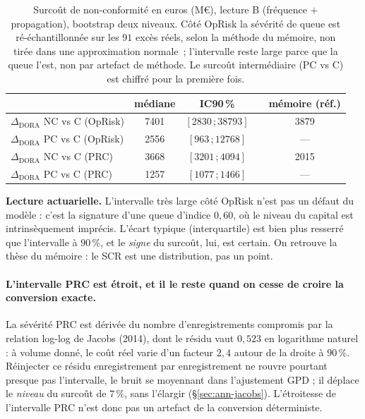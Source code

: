 \begin{table}[htbp]\centering\small
\renewcommand{\arraystretch}{1.25}
\begin{tabular}{@{}l cc c c@{}}
\toprule
& médiane & IC90\,\% & & mémoire (réf.) \\
\midrule
$\Delta_{\text{DORA}}$ NC vs C (OpRisk) & 7401 & $[2830\,;38793]$ & & 3879 \\
$\Delta_{\text{DORA}}$ PC vs C (OpRisk) & 2556 & $[963\,;12768]$  & & --- \\
$\Delta_{\text{DORA}}$ NC vs C (PRC)    & 3668 & $[3201\,;4094]$  & & 2015 \\
$\Delta_{\text{DORA}}$ PC vs C (PRC)    & 1257 & $[1077\,;1466]$  & & --- \\
\bottomrule
\end{tabular}
\caption{Surcoût de non-conformité en euros (M\euro), lecture B (fréquence $+$ propagation),
bootstrap deux niveaux. Côté OpRisk la sévérité de queue est ré-échantillonnée sur les
$91$ excès réels, selon la méthode du mémoire, non tirée dans une approximation
normale~; l'intervalle reste large parce que la queue l'est, non par artefact de méthode.
Le surcoût intermédiaire (PC vs C) est chiffré pour la première fois.}
\label{tab:delta}
\end{table}

\noindent \textbf{Lecture actuarielle.} L'intervalle très large côté OpRisk n'est pas un défaut
du modèle : c'est la signature d'une queue d'indice $0{,}60$, où le niveau du capital est
intrinsèquement imprécis. L'écart typique (interquartile) est bien plus resserré que
l'intervalle à $90\,\%$, et le \emph{signe} du surcoût, lui, est certain. On retrouve la thèse du
mémoire : le SCR est une distribution, pas un point.

\paragraph{L'intervalle PRC est étroit, et il le reste quand on cesse de croire la conversion
exacte.} La sévérité PRC est dérivée du nombre d'enregistrements compromis par la relation
log-log de Jacobs (2014), dont le résidu vaut $0{,}523$ en logarithme naturel : à volume donné,
le coût réel varie d'un facteur $2{,}4$ autour de la droite à $90\,\%$. Réinjecter ce résidu
enregistrement par enregistrement ne rouvre pourtant presque pas l'intervalle, le bruit se
moyennant dans l'ajustement GPD ; il déplace le \emph{niveau} du surcoût de $7\,\%$, sans
l'élargir (\S\ref{sec:ann-jacobs}). L'étroitesse de l'intervalle PRC n'est donc pas un artefact
de la conversion déterministe.

